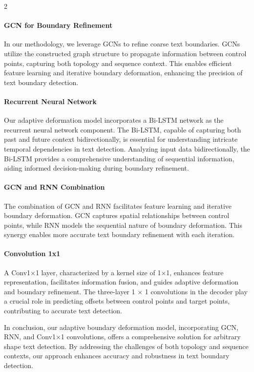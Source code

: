 \documentclass[sn-mathphys,Numbered]{sn-jnl}%
\begin{document}
\begin{multicols}{2}
\paragraph{GCN for Boundary Refinement}

In our methodology, we leverage GCNs to refine coarse text boundaries. GCNs utilize the constructed graph structure to propagate information between control points, capturing both topology and sequence context. This enables efficient feature learning and iterative boundary deformation, enhancing the precision of text boundary detection.

\paragraph{Recurrent Neural Network}
Our adaptive deformation model incorporates a Bi-LSTM network as the recurrent neural network component. The Bi-LSTM, capable of capturing both past and future context bidirectionally, is essential for understanding intricate temporal dependencies in text detection. Analyzing input data bidirectionally, the Bi-LSTM provides a comprehensive understanding of sequential information, aiding informed decision-making during boundary refinement.

\paragraph{GCN and RNN Combination}
The combination of GCN and RNN facilitates feature learning and iterative boundary deformation. GCN captures spatial relationships between control points, while RNN models the sequential nature of boundary deformation. This synergy enables more accurate text boundary refinement with each iteration.

\paragraph{Convolution 1x1}
A Conv1×1 layer, characterized by a kernel size of 1×1, enhances feature representation, facilitates information fusion, and guides adaptive deformation and boundary refinement. The three-layer 1 × 1 convolutions in the decoder play a crucial role in predicting offsets between control points and target points, contributing to accurate text detection.

In conclusion, our adaptive boundary deformation model, incorporating GCN, RNN, and Conv1×1 convolutions, offers a comprehensive solution for arbitrary shape text detection. By addressing the challenges of both topology and sequence contexts, our approach enhances accuracy and robustness in text boundary detection.


\end{multicols}
\end{document}
